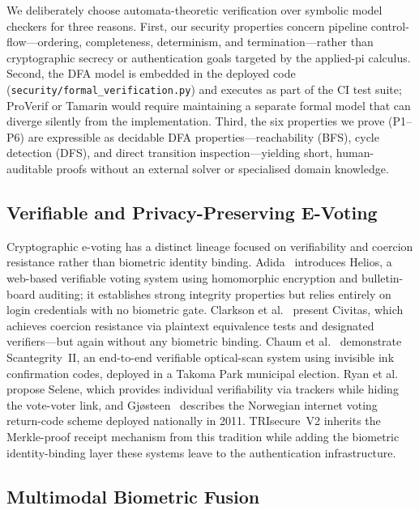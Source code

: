 \documentclass[preprint,12pt]{elsarticle}
\begin{document}
We deliberately choose automata-theoretic verification over symbolic
model checkers for three reasons. First, our security properties concern
pipeline control-flow—ordering, completeness, determinism, and
termination—rather than cryptographic secrecy or authentication goals
targeted by the applied-pi calculus. Second, the DFA model is embedded
in the deployed code (\texttt{security/formal\_verification.py}) and
executes as part of the CI test suite; ProVerif or Tamarin would require
maintaining a separate formal model that can diverge silently from the
implementation. Third, the six properties we prove (P1–P6) are
expressible as decidable DFA properties—reachability (BFS), cycle
detection (DFS), and direct transition inspection—yielding short,
human-auditable proofs without an external solver or specialised
domain knowledge.

\subsection{Verifiable and Privacy-Preserving E-Voting}

Cryptographic e-voting has a distinct lineage focused on verifiability and
coercion resistance rather than biometric identity binding.
Adida~\cite{adida2008helios} introduces Helios, a web-based verifiable voting
system using homomorphic encryption and bulletin-board auditing; it establishes
strong integrity properties but relies entirely on login credentials with no
biometric gate.
Clarkson et al.~\cite{clarkson2008civitas} present Civitas, which achieves
coercion resistance via plaintext equivalence tests and designated
verifiers—but again without any biometric binding.
Chaum et al.~\cite{chaum2009scantegrity} demonstrate Scantegrity~II, an
end-to-end verifiable optical-scan system using invisible ink confirmation
codes, deployed in a Takoma Park municipal election.
Ryan et al.~\cite{ryan2016selene} propose Selene, which provides individual
verifiability via trackers while hiding the vote-voter link, and
Gjøsteen~\cite{gjosteen2010norwegian} describes the Norwegian internet voting
return-code scheme deployed nationally in 2011.
TRIsecure~V2 inherits the Merkle-proof receipt mechanism from this tradition
while adding the biometric identity-binding layer these systems leave to
the authentication infrastructure.

\subsection{Multimodal Biometric Fusion}
\end{document}
